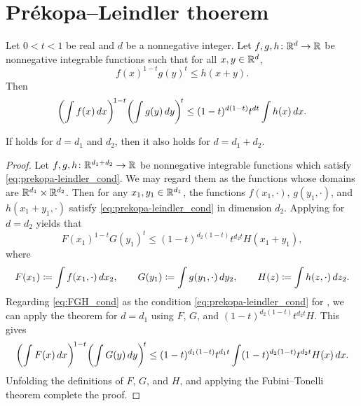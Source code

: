 \section{Pr\'{e}kopa--Leindler thoerem}

\begin{theorem}
    \label{thm:prekopa-leindler}
    Let \(0<t<1\) be real and \(d\) be a nonnegative integer. Let \(f,g,h\colon \mathbb{R}^d\to \mathbb{R}\) be nonnegative integrable functions such that for all \(x,y\in \mathbb{R}^d\),
    \begin{equation}\label{eq:prekopa-leindler_cond}
        f(x)^{1-t} g(y)^{t} \le h(x+y).
    \end{equation}
    Then
    \[
        \biggl( \int f(x) \mathop{d\!} x \biggr)^{\!1-t} \biggl( \int g(y) \mathop{d\!} y \biggr)^{\!t} \le (1-t)^{d(1-t)} t^{dt} \int h(x) \mathop{d\!} x.
    \]
\end{theorem}

\begin{lemma}
    If  holds for \(d=d_1\) and \(d_2\), then it also holds for \(d=d_1+d_2\).
\end{lemma}
\begin{proof}
    Let \(f,g,h\colon \mathbb{R}^{d_1+d_2}\to \mathbb{R}\) be nonnegative integrable functions which satisfy \eqref{eq:prekopa-leindler_cond}. We may regard them as the functions whose domains are \(\mathbb{R}^{d_1}\times \mathbb{R}^{d_2}\). Then for any \(x_1,y_1\in \mathbb{R}^{d_1}\), the functions \(f(x_1,\cdot)\), \(g(y_1,\cdot)\), and \(h(x_1+y_1,\cdot)\) satisfy \eqref{eq:prekopa-leindler_cond} in dimension \(d_2\). Applying  for \(d=d_2\) yields that
    \begin{equation}\label{eq:FGH_cond}
        F(x_1)^{1-t} G(y_1)^{t}
        \le (1-t)^{d_2(1-t)} t^{d_2t} H(x_1+y_1),
    \end{equation}
    where
    \[
        F(x_1) \coloneqq \int f(x_1,\cdot) \mathop{d\!} x_2, \qquad
        G(y_1) \coloneqq \int g(y_1,\cdot) \mathop{d\!} y_2, \qquad
        H(z) \coloneqq \int h(z,\cdot) \mathop{d\!} z_2.
    \]
    Regarding \eqref{eq:FGH_cond} as the condition \eqref{eq:prekopa-leindler_cond} for , we can apply the theorem for \(d=d_1\) using \(F\), \(G\), and \((1-t)^{d_2(1-t)} t^{d_2 t} H\). This gives
    \[
        \biggl( \int F(x) \mathop{d\!} x \biggr)^{\!1-t} \biggl( \int G(y) \mathop{d\!} y \biggr)^{\!t} 
        \le (1-t)^{d_1(1-t)} t^{d_1t} \int (1-t)^{d_2(1-t)} t^{d_2 t} H(x) \mathop{d\!} x.
    \]
    Unfolding the definitions of \(F\), \(G\), and \(H\), and applying the Fubini--Tonelli theorem complete the proof.
\end{proof}

